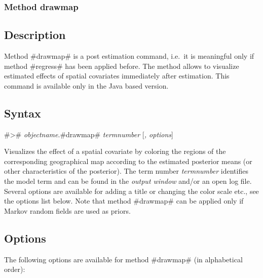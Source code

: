 \subsubsection{Method drawmap}
\label{bayesregdrawmap} 

\subsection*{Description}

Method #drawmap# is a post estimation command, i.e.~it is
meaningful only if method #regress# has been applied before. The
method allows to visualize estimated effects of spatial covariates
immediately after estimation. This command is available only in
the Java based version.

\subsection*{Syntax}

#># {\em objectname}.#drawmap# {\em termnumber} [{\em , options}]

Visualizes the effect of a spatial covariate by coloring the
regions of the corresponding geographical map according to the
estimated posterior means (or other characteristics of the
posterior). The term number {\em termnumber} identifies the model
term and can be found in the {\em output window} and/or an open
log file. Several options are available for adding a title or
changing the color scale etc., see the options list below. Note
that method #drawmap# can be applied only if Markov random fields
are used as priors.

\subsection*{Options}

The following options are available for method #drawmap# (in
alphabetical order):

